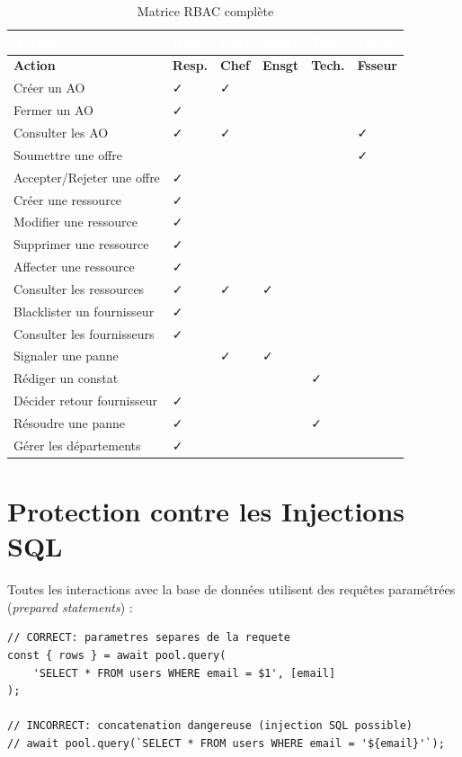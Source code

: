 \documentclass[12pt,a4paper]{report}
\begin{document}
\begin{longtable}{|L{4cm}|C{1.5cm}|C{1.5cm}|C{1.5cm}|C{1.5cm}|C{1.5cm}|}
\caption{Matrice RBAC complète} \\
\hline
{}\textcolor{white}{\textbf{Action}} & \textcolor{white}{\textbf{Resp.}} & \textcolor{white}{\textbf{Chef}} & \textcolor{white}{\textbf{Ensgt}} & \textcolor{white}{\textbf{Tech.}} & \textcolor{white}{\textbf{Fsseur}} \\
\hline
\endfirsthead
\hline
\textbf{Action} & \textbf{Resp.} & \textbf{Chef} & \textbf{Ensgt} & \textbf{Tech.} & \textbf{Fsseur} \\
\hline
\endhead
Créer un AO & ✓ & ✓ & & & \\
\hline
Fermer un AO & ✓ & & & & \\
\hline
Consulter les AO & ✓ & ✓ & & & ✓ \\
\hline
Soumettre une offre & & & & & ✓ \\
\hline
Accepter/Rejeter une offre & ✓ & & & & \\
\hline
Créer une ressource & ✓ & & & & \\
\hline
Modifier une ressource & ✓ & & & & \\
\hline
Supprimer une ressource & ✓ & & & & \\
\hline
Affecter une ressource & ✓ & & & & \\
\hline
Consulter les ressources & ✓ & ✓ & ✓ & & \\
\hline
Blacklister un fournisseur & ✓ & & & & \\
\hline
Consulter les fournisseurs & ✓ & & & & \\
\hline
Signaler une panne & & ✓ & ✓ & & \\
\hline
Rédiger un constat & & & & ✓ & \\
\hline
Décider retour fournisseur & ✓ & & & & \\
\hline
Résoudre une panne & ✓ & & & ✓ & \\
\hline
Gérer les départements & ✓ & & & & \\
\hline
\end{longtable}

\section{Protection contre les Injections SQL}

Toutes les interactions avec la base de données utilisent des requêtes paramétrées (\textit{prepared statements}) :

\begin{lstlisting}[style=js, caption={Bonne pratique — Requêtes paramétrées}]
// CORRECT: parametres separes de la requete
const { rows } = await pool.query(
    'SELECT * FROM users WHERE email = $1', [email]
);

// INCORRECT: concatenation dangereuse (injection SQL possible)
// await pool.query(`SELECT * FROM users WHERE email = '${email}'`);
\end{lstlisting}
\end{document}

